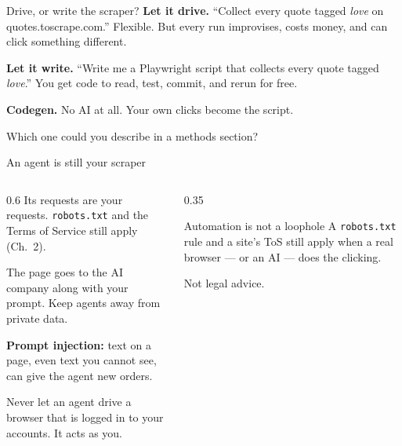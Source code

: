 \documentclass[9pt,aspectratio=169]{beamer}
\begin{document}
\begin{frame}{Drive, or write the scraper?}
    \textbf{Let it drive.} ``Collect every quote tagged \textit{love} on quotes.toscrape.com.'' Flexible. But every run improvises, costs money, and can click something different.

    \bigskip
    \textbf{Let it write.} ``Write me a Playwright script that collects every quote tagged \textit{love}.'' You get code to read, test, commit, and rerun for free.

    \bigskip
    \textbf{Codegen.} No AI at all. Your own clicks become the script.

    \bigskip
    Which one could you describe in a methods section?
\end{frame}

\begin{frame}{An agent is still your scraper}
    \begin{columns}[T]
        \begin{column}{0.6\textwidth}
            Its requests are your requests. \texttt{robots.txt} and the Terms of Service still apply (Ch.~2).

            \medskip
            The page goes to the AI company along with your prompt. Keep agents away from private data.

            \medskip
            \textbf{Prompt injection:} text on a page, even text you cannot see, can give the agent new orders.

            \medskip
            Never let an agent drive a browser that is logged in to your accounts. It acts as you.
        \end{column}
        \begin{column}{0.35\textwidth}
            \begin{alertblock}{Automation is not a loophole}
                \footnotesize A \texttt{robots.txt} rule and a site's ToS still apply when a real browser --- or an AI --- does the clicking.
            \end{alertblock}

            \medskip
            {\scriptsize Not legal advice.}
        \end{column}
    \end{columns}
\end{frame}
\end{document}
